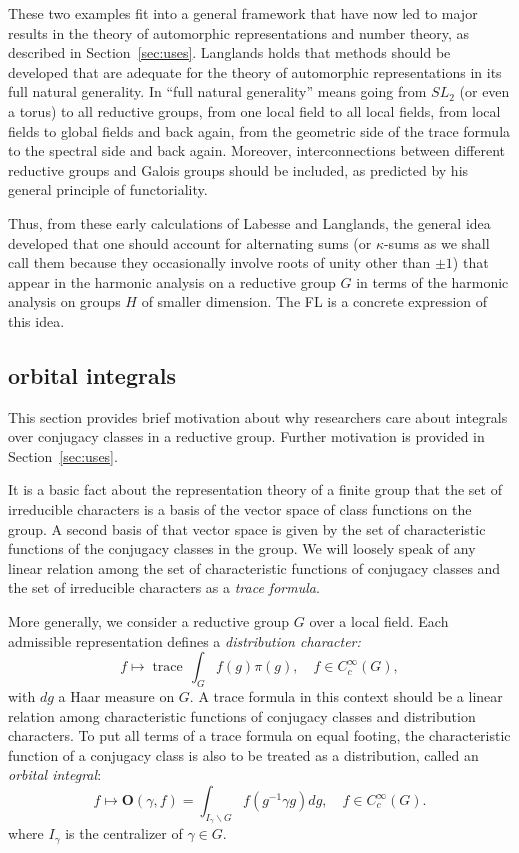 \documentclass[brochure,english,12pt]{bourbaki}
\def\op#1{{\operatorname{#1}}}
\def\OO{{\mathbf O}}
\begin{document}
These two examples fit into a general framework that have now led to major
results in the theory of automorphic representations and number
theory, as described in Section~\ref{sec:uses}.  Langlands holds that methods
should be developed that are adequate for the theory of automorphic
representations in its full natural generality.  In ``full natural
generality'' means going from $SL_2$ (or even a torus) to all
reductive groups, from one local field to all local fields, from local
fields to global fields and back again, from the geometric side of the
trace formula to the spectral side and back again.  Moreover,
interconnections between different reductive groups and Galois groups
should be included, as predicted by his general principle of
functoriality.


Thus, from these early calculations of Labesse and Langlands, the
general idea developed that one should account for alternating sums
(or $\kappa$-sums as we shall call them because they occasionally 
involve roots of unity other than $\pm1$) that appear in the harmonic
analysis on a reductive group $G$ in terms of the harmonic analysis on
groups $H$ of smaller dimension.  The FL is a concrete
expression of this idea.

\subsection{orbital integrals}

This section provides brief motivation about why researchers care about integrals over conjugacy
classes in a reductive group.  Further motivation is provided in Section~\ref{sec:uses}.

It is a basic fact about the representation theory of a finite group that the set of irreducible characters
is a basis of the vector space of class functions on the group.  A second basis of that vector
space is given by the set of characteristic functions of the conjugacy classes in the group.
We will loosely speak of any linear relation among the set of characteristic functions of conjugacy classes
and the set
of irreducible characters as a {\it trace formula}.

More generally, we consider a reductive group $G$ over a local field.
Each admissible representation defines a {\it distribution character:}
\[
f\mapsto
\op{trace}\,\int_G f(g)\pi(g),\quad  f\in C_c^\infty(G),
\]
with $dg$  a Haar measure on $G$.
A trace formula in this context should be a linear
relation among characteristic functions of conjugacy classes and
distribution characters.  To put all terms of a trace formula on equal
footing, the characteristic function of a conjugacy class is also to be
treated as a distribution, called an {\it orbital integral}:
\[
f\mapsto \OO(\gamma,f) = \int_{I_\gamma\backslash G} f(g^{-1}\gamma g) dg,\quad f\in C_c^\infty(G).
\]
where $I_\gamma$ is the centralizer of $\gamma\in G$.
\end{document}
